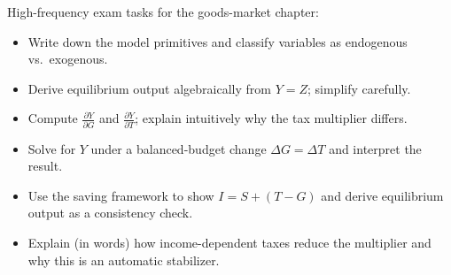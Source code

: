 \begin{examtip}
High-frequency exam tasks for the goods-market chapter:
\begin{itemize}
\item Write down the model primitives and classify variables as endogenous vs.\ exogenous.
\item Derive equilibrium output algebraically from $Y=Z$; simplify carefully.
\item Compute $\frac{\partial Y}{\partial G}$ and $\frac{\partial Y}{\partial T}$; explain intuitively why the tax multiplier differs.
\item Solve for $Y$ under a balanced-budget change $\Delta G=\Delta T$ and interpret the result.
\item Use the saving framework to show $I=S+(T-G)$ and derive equilibrium output as a consistency check.
\item Explain (in words) how income-dependent taxes reduce the multiplier and why this is an automatic stabilizer.
\end{itemize}
\end{examtip}
